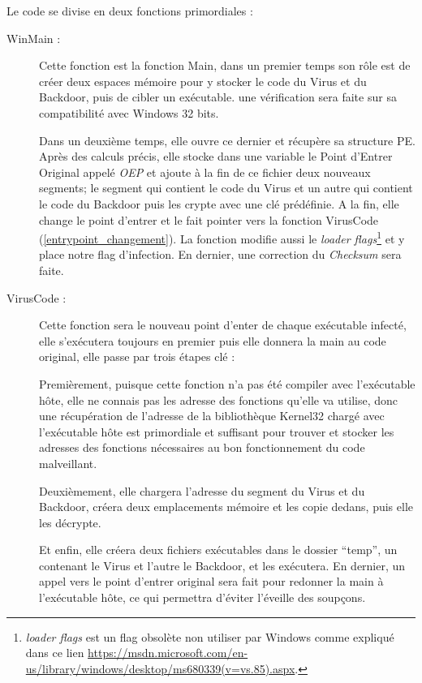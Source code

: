     Le code se divise en deux fonctions primordiales :
    \begin{description}
        \item[WinMain :] Cette fonction est la fonction Main, dans un premier temps son rôle est de créer 
        deux espaces mémoire pour y stocker le code du Virus et du Backdoor, puis de cibler un exécutable. 
        une vérification sera faite sur sa compatibilité avec Windows 32 bits.

        Dans un deuxième temps, elle ouvre ce dernier et récupère sa structure PE. Après des calculs précis, 
        elle stocke dans une variable le Point d’Entrer Original appelé \emph{OEP} et ajoute à la fin de ce 
        fichier deux nouveaux segments; le segment qui contient le code du Virus et un autre qui contient 
        le code du Backdoor puis les crypte avec une clé prédéfinie. A la fin, elle 
        change le point d’entrer et le fait pointer vers la fonction VirusCode (\autoref{entrypoint_changement}).
        La fonction modifie aussi le \emph{loader flags}\footnote{\emph{loader flags} est un flag obsolète non
        utiliser par Windows comme expliqué dans ce lien \url{https://msdn.microsoft.com/en-us/library/windows/desktop/ms680339(v=vs.85).aspx}.} et y place notre flag d'infection. En dernier, une correction du \emph{Checksum}
        sera faite.
        
        \item[VirusCode :] Cette fonction sera le nouveau point d’enter de chaque exécutable infecté, 
            elle s’exécutera toujours en premier puis elle donnera la main au code original, 
            elle passe par trois étapes clé :

            Premièrement, puisque cette fonction n'a pas été compiler avec l’exécutable hôte, elle ne connais pas les adresse des fonctions qu'elle va utilise,
            donc une récupération de l’adresse de la bibliothèque Kernel32
            chargé avec l’exécutable hôte est primordiale et suffisant pour trouver et stocker les
            adresses des fonctions nécessaires au bon fonctionnement du code malveillant.

            Deuxièmement, elle chargera l’adresse du segment du Virus et du Backdoor, créera deux 
            emplacements mémoire et les copie dedans, puis elle les décrypte.

            Et enfin, elle créera deux fichiers exécutables dans le dossier “temp”, un contenant le Virus et 
            l’autre le Backdoor, et les exécutera. En dernier, un appel vers le point d’entrer original sera fait
            pour redonner la main à l'exécutable hôte, ce qui permettra d'éviter l'éveille des soupçons.

    \end{description}

